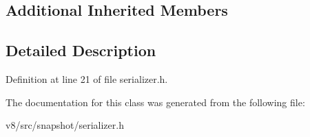 \subsection*{Additional Inherited Members}


\subsection{Detailed Description}


Definition at line 21 of file serializer.\+h.



The documentation for this class was generated from the following file\+:\begin{DoxyCompactItemize}
\item 
v8/src/snapshot/serializer.\+h\end{DoxyCompactItemize}
